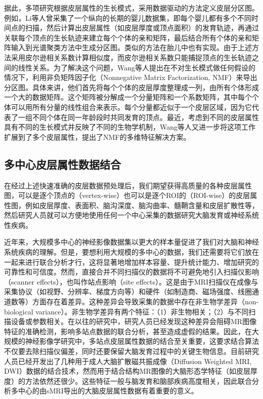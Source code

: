 据此，多项研究根据皮层属性的生长模式，采用数据驱动的方法定义皮层分区图。例如，Li等人\cite{li2015parcellation}曾采集了一个纵向的长期的婴儿数据集，即每个婴儿都有多个不同时间点的扫描，然后计算出皮层属性（如皮层厚度或顶点面积）的发育轨迹，再通过关联每个顶点的生长轨迹来建立每个个体的亲和矩阵，最后结合所有个体的亲和矩阵输入到光谱聚类方法中生成分区图。类似的方法在胎儿中也有实现\cite{xia2019fetal}。由于上述方法采用皮尔逊相关系数计算相似度，而皮尔逊相关系数只能捕捉顶点的生长轨迹之间的线性关系。为了解决这个问题，Wang等人\cite{wang2019developmental}提出在不对生长模式做任何假设的情况下，利用非负矩阵因子化（Nonnegative Matrix Factorization, NMF）来导出分区图。具体来讲，他们首先将每个个体的皮层厚度整理成一列，由所有个体形成一个大的数据矩阵。这个矩阵被分解成一个分量矩阵和一个系数矩阵，其中每个个体可以用所有分量的线性组合来表示。每个分量都近似于一个皮层区域，因为它代表了一组不同个体在同一年龄段时共同发育的顶点。最近，考虑到不同的皮层属性具有不同的生长模式并反映了不同的生物学机制，Wang等人又进一步\cite{wang2019revealing}将这项工作扩展到了多个皮层属性，提出了NMF的多维特征解决方案。


\subsection{多中心皮层属性数据结合}\label{sec:绪论_多中心皮层属性数据结合}
在经过上述快速准确的皮层数据预处理后，我们期望获得高质量的各种皮层属性图，可以是逐个顶点的（vertex-wise）也可以是逐个ROI的（ROI-wise）的皮层属性图，例如皮层厚度、表面积、脑沟深度、脑沟曲率、髓鞘含量和皮层扩散性等，然后研究人员就可以方便地使用任何一个中心采集的数据研究大脑发育或神经系统性疾病。

近年来，大规模多中心的神经影像数据集以更大的样本量促进了我们对大脑和神经系统疾病的理解\cite{howell2019unc,li2019computational,glasser2013minimal}。但是，要想利用大规模的多中心的数据，我们还需要将它们放在一起来进行联合分析才行，这将显著地增加样本容量、提升统计能力、增加研究的可靠性和可信度。然而，直接合并不同扫描仪的数据将不可避免地引入扫描仪影响（scanner effects），也叫作站点影响（site effects）。这是由于MRI扫描仪在成像与采集协议（如视野、分辨率、梯度方向等）和硬件（如制造商、磁场强度、线圈通道数等）方面存在着差异。这种差异会导致采集的数据中存在非生物学差异（non-biological variance）。非生物学差异有两个特征：（1）非生物相关；（2）与不同扫描设备或参数相关。在以往的研究中，研究人员已经发现这种差异会阻碍MR图像特征的准确检测\cite{han2006reliability,takao2011effect}，影响多站点数据的联合分析\cite{fortin2018harmonization}，甚至造成虚假的结果\cite{rao2017predictive}。因此，在大规模的神经影像学研究中，多站点皮层属性数据的结合至关重要，这要求结合算法不仅要去除扫描仪偏差，同时还要保留大脑发育过程中的关键生物信息。目前研究人员已经开发出了几种用于成人大脑扩散磁共振成像（Diffusion Weighted MRI, DWI）数据的结合技术\cite{huynh2019multi,karayumak2018harmonizing,karayumak2019retrospective}，然而用于结合结构MR图像的大脑形态学特征（如皮层厚度）的方法依然还很少。这些特征一般与脑发育和脑部疾病高度相关，因此联合分析多中心的由sMRI导出的大脑皮层属性数据有着重要的意义。

